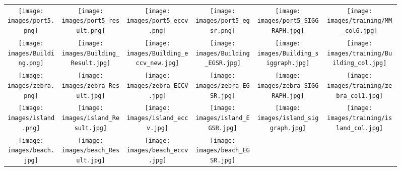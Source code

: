 \documentclass[twocolumn]{svjour3}          %
\begin{document}
\begin{figure*}\center
\begin{minipage}[t]{\linewidth}
\centering
\begin{tabular}{c@{\hspace{.7mm}} c@{\hspace{0.7mm}} c@{\hspace{0.7mm}} c@{\hspace{0.7mm}} c@{\hspace{0.7mm}} |c@{\hspace{0mm}}}
\texttt{[image: images/port5.png]}&
\texttt{[image: images/port5\_result.png]}&
\texttt{[image: images/port5\_eccv.png]}&
\texttt{[image: images/port5\_egsr.png]}&
\texttt{[image: images/port5\_SIGGRAPH.jpg]}&
\texttt{[image: images/training/MM\_col6.jpg]}\\
\texttt{[image: images/Building.png]}&
\texttt{[image: images/Building\_Result.jpg]}&
\texttt{[image: images/Building\_eccv\_new.jpg]}&
\texttt{[image: images/Building\_EGSR.jpg]}&
\texttt{[image: images/Building\_siggraph.jpg]}&
\texttt{[image: images/training/Building\_col.jpg]}\\
\texttt{[image: images/zebra.png]}&
\texttt{[image: images/zebra\_Result.jpg]}&
\texttt{[image: images/zebra\_ECCV.jpg]}&
\texttt{[image: images/zebra\_EGSR.jpg]}&
\texttt{[image: images/zebra\_SIGGRAPH.jpg]}&
\texttt{[image: images/training/zebra\_col1.jpg]}\\
\texttt{[image: images/island.png]}&
\texttt{[image: images/island\_Result.jpg]}&
\texttt{[image: images/island\_eccv.jpg]}&
\texttt{[image: images/island\_EGSR.jpg]}&
\texttt{[image: images/island\_siggraph.jpg]}&
\texttt{[image: images/training/island\_col.jpg]}\\
\texttt{[image: images/beach.jpg]}&
\texttt{[image: images/beach\_Result.jpg]}&
\texttt{[image: images/beach\_eccv.jpg]}&
\texttt{[image: images/beach\_EGSR.jpg]}&

\end{tabular}
\end{minipage}
\end{figure*}
\end{document}
